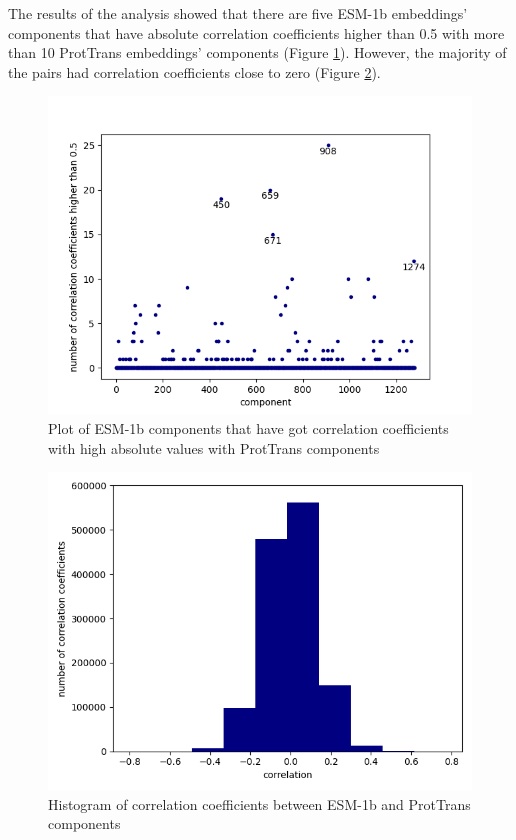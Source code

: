\documentclass[12pt]{article}
\begin{document}
	The results of the analysis showed that there are five ESM-1b
	embeddings' components that have absolute correlation coefficients 
	higher than 0.5 with more than 10 ProtTrans embeddings' components  
	(Figure \ref{figure:highCorrelationComponents}). However, the majority
	of the pairs had correlation coefficients close to zero 
	(Figure \ref{figure:correlationComponentsHisto}).

	\begin{figure}[h!]
		\centering
		\includegraphics[scale=0.85]{validation_small_set_2_joined_correlation_high_corr.png}

		\caption{Plot of ESM-1b components that have got correlation 
		coefficients with high absolute values with ProtTrans components}
		\label{figure:highCorrelationComponents}
	\end{figure}

	\newpage

	\begin{figure}[h!]
		\centering
		\includegraphics[scale=0.85]{validation_small_set_2_joined_correlation_hist.png}

		\caption{Histogram of correlation coefficients between ESM-1b 
		and ProtTrans components}
		\label{figure:correlationComponentsHisto}
	\end{figure}
\end{document}
